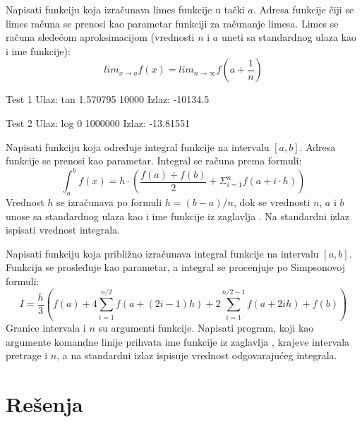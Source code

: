 \begin{Exercise}[label=346]
Napisati funkciju koja izračunava limes funkcije  u   
tački $a$. Adresa funkcije  čiji se limes računa
se prenosi kao parametar funkciji za računanje limesa.  Limes se
računa sledećom aproksimacijom (vrednosti $n$ i $a$ uneti sa
standardnog ulaza kao i ime funkcije):
$$ lim_{x \rightarrow a} f(x) = lim_{n \rightarrow \infty} f(a + \frac{1}{n})$$

\begin{miditest}
\begin{test}{Test 1}
Ulaz:   tan 1.570795 10000
Izlaz:  -10134.5
\end{test}
\end{miditest}
\begin{miditest}
\begin{test}{Test 2}
Ulaz:   log 0 1000000
Izlaz:  -13.81551
\end{test}
\end{miditest}
\end{Exercise}
\begin{Answer}[ref=346]
\end{Answer}

\begin{Exercise}[label=347]
Napisati funkciju koja određuje integral funkcije  na
intervalu $[a, b]$.  Adresa funkcije  se prenosi kao
parametar. Integral se računa prema formuli:
$$ \int_{a}^{b} f(x) = h \cdot (\frac{f(a)+f(b)}{2} + \Sigma_{i=1}^{n}
f(a+i \cdot h))$$ 
Vrednost $h$ se izračunava po formuli $h = (b-a)/n$, dok se vrednosti $n$, $a$ i $b$ unose sa standardnog
ulaza kao i ime funkcije iz zaglavlja
. Na standardni izlaz ispisati vrednost integrala.
\end{Exercise}
\begin{Answer}[ref=347]
\end{Answer}

\begin{Exercise}[label=348]
Napisati funkciju koja približno izračunava integral      
funkcije  na intervalu $[a, b]$. Funkcija  se prosleđuje
kao parametar, a integral se procenjuje po Simpsonovoj formuli:
$$I = \frac{h}{3}\left(f(a) + 4 \sum_{i=1}^{n/2}f(a+(2i-1)h) + 2  
\sum_{i=1}^{n/2-1}f(a+2ih) + f(b)\right)$$ 
Granice intervala i $n$ su argumenti funkcije. Napisati program, koji kao
argumente komandne linije prihvata ime funkcije iz zaglavlja
, krajeve intervala pretrage i $n$, a na standardni izlaz ispisuje vrednost odgovarajućeg integrala.
\end{Exercise}
\begin{Answer}[ref=348]
\end{Answer}
\section{Rešenja}
\shipoutAnswer

